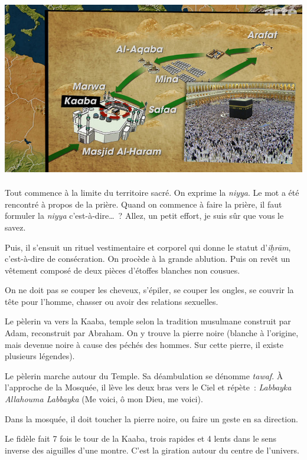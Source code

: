
\includegraphics[width=5.51181in,height=3.09931in]{Images/image066.jpg}

Tout commence à la limite du territoire sacré. On exprime la
\emph{niyya}. Le mot a été rencontré à propos de la prière. Quand on
commence à faire la prière, il faut formuler la \emph{niyya}
c'est-à-dire\ldots~? Allez, un petit effort, je suis sûr que vous le
savez.

Puis, il s'ensuit un rituel vestimentaire et corporel qui donne le
statut d'\emph{iḥrām}, c'est-à-dire de consécration. On procède à la
grande ablution. Puis on revêt un vêtement composé de deux pièces
d'étoffes blanches non cousues.

On ne doit pas se couper les cheveux, s'épiler, se couper les ongles, se
couvrir la tête pour l'homme, chasser ou avoir des relations sexuelles.

Le pèlerin va vers la Kaaba, temple selon la tradition musulmane
construit par Adam, reconstruit par Abraham. On y trouve la pierre noire
(blanche à l'origine, mais devenue noire à cause des péchés des hommes.
Sur cette pierre, il existe plusieurs légendes).

Le pèlerin marche autour du Temple. Sa déambulation se dénomme
\emph{tawaf}. À l'approche de la Mosquée, il lève les deux bras vers le
Ciel et répète~: \emph{Labbayka Allahouma Labbayka} (Me voici, ô mon
Dieu, me voici).

Dans la mosquée, il doit toucher la pierre noire, ou faire un geste en
sa direction.

Le fidèle fait 7 fois le tour de la Kaaba, trois rapides et 4 lents dans
le sens inverse des aiguilles d'une montre. C'est la giration autour du
centre de l'univers.

